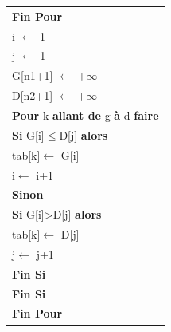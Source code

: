 \documentclass[10pt]{article}
\begin{document}
\begin{pseudo}
\begin{center}
\begin{tabular}{p{}}
\hspace{.4cm} \textbf{Fin Pour}\\
\hspace{.4cm} \textsf{i $\leftarrow$ 1}\\
\hspace{.4cm} \textsf{j $\leftarrow$ 1}\\
\hspace{.4cm} \textsf{G[n1+1] $\leftarrow$ $+\infty$}\\
\hspace{.4cm} \textsf{D[n2+1] $\leftarrow$ $+\infty$}\\
\hspace{.4cm} \textbf{Pour} \textsf{k} \textbf{allant de} \textsf{g} \textbf{à} \textsf{d} \textbf{faire}\\
\hspace{.8cm} \textbf{Si}  \textsf{G[i]$\leq$D[j]} \textbf{alors} \\
\hspace{1.2cm} \textsf{tab[k]$\leftarrow$ G[i]} \\
\hspace{1.2cm} \textsf{i$\leftarrow$ i+1} \\
\hspace{.8cm} \textbf{Sinon} \\
\hspace{1.2cm} \textbf{Si} \textsf{G[i]>D[j]} \textbf{alors} \\
\hspace{1.6cm} \textsf{tab[k]$\leftarrow$ D[j]} \\
\hspace{1.6cm} \textsf{j$\leftarrow$ j+1} \\
\hspace{1.2cm} \textbf{Fin Si} \\
\hspace{.8cm} \textbf{Fin Si} \\
\hspace{.4cm}  \textbf{Fin Pour}\\
\hline
\end{tabular}
\end{center}
\end{pseudo}
\end{document}
